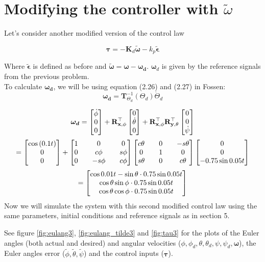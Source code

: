 \section{Modifying the controller with $\tilde{\omega}$}

Let's consider another modified version of the control law

$$\boldsymbol{\tau} = -\mathbf{K}_d \boldsymbol{\tilde \omega} - k_p  \boldsymbol{\tilde \epsilon} $$

Where $\boldsymbol{\tilde \epsilon}$ is defined as before and $\boldsymbol{\tilde \omega} = \boldsymbol{\omega - \omega_d}. $ $\boldsymbol{\omega}_d$ is given by the reference signals from the previous problem.\\


To calculate $\boldsymbol{\omega_d}$, we will be using equation (2.26) and (2.27) in Fossen\cite{bok}:
$$ \boldsymbol{\omega_d} = \mathbf{T}_{\Theta_d}^{-1}(\Theta_d) \dot \Theta_d $$


$$ \boldsymbol{\omega_d} = \begin{bmatrix}\dot \phi \\ 0 \\ 0\end{bmatrix} + \mathbf{R_{x, \phi}^\top} \begin{bmatrix}0 \\ \dot \theta \\ 0\end{bmatrix} + \mathbf{R_{x, \phi}^\top} \mathbf{R_{y, \theta}^\top} \begin{bmatrix}0 \\ 0 \\ \dot \psi\end{bmatrix} $$
$$ = \begin{bmatrix}\cos{(0.1t)} \\ 0 \\ 0\end{bmatrix} + \begin{bmatrix}1 && 0 && 0 \\ 0 && c\phi && s\phi \\ 0 && -s\phi && c\phi\end{bmatrix} \begin{bmatrix}c\theta && 0 && -s\theta \\ 0 && 1 && 0 \\ s\theta && 0 && c\theta\end{bmatrix} \begin{bmatrix}0 \\ 0 \\ -0.75 \sin{0.05t}\end{bmatrix}$$
$$ = \begin{bmatrix}\cos{0.01t} - \sin\theta \cdot 0.75 \sin{0.05t} \\ \cos \theta \sin\phi \cdot 0.75 \sin{0.05t} \\ \cos \theta \cos \phi  \cdot 0.75 \sin{0.05t} \end{bmatrix} $$
Now we will simulate the system with this second modified control law using the same parameters, initial conditions and reference signals as in section 5.

See figure \ref{fig:eulang3}, \ref{fig:eulang_tilde3} and \ref{fig:tau3} for the plots of the Euler angles (both actual and desired) and angular velocities ($\phi, \phi_d, \theta, \theta_d, \psi, \psi_d, \boldsymbol{\omega}$), the Euler angles error ($\tilde \phi, \tilde \theta, \tilde \psi$) and the control inputs ($\boldsymbol{\tau}$).

